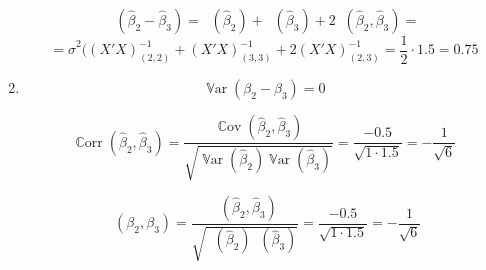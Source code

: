 \documentclass[12pt]{article}
\DeclareMathOperator{\Cov}{\mathbb{C}ov}
\DeclareMathOperator{\Corr}{\mathbb{C}orr}
\DeclareMathOperator{\Var}{\mathbb{V}ar}
\DeclareMathOperator{\hVar}{\widehat{\Var}}
\DeclareMathOperator{\hCov}{\widehat{\Cov}}
\DeclareMathOperator{\hCorr}{\widehat{\Corr}}
\newcommand{\hb}{\hat{\beta}}
\begin{document}
\begin{problem}
\begin{sol}
\begin{enumerate}
\[
\hVar(\hb_2-\hb_3)=\hVar(\hb_2)+\hVar(\hb_3)+2\hCov(\hb_2,\hb_3)=
\]
\[=\hat\sigma^2((X'X)^{-1}_{(2,2)}+(X'X)^{-1}_{(3,3)}+2(X'X)^{-1}_{(2,3)}=\frac{1}{2}\cdot1.5=0.75
\]

\item
\[
\Var(\beta_2-\beta_3)=0
\]

\[
\Corr(\hb_2,\hb_3)=\frac{\Cov(\hb_2,\hb_3)}{\sqrt{\Var(\hb_2)\Var(\hb_3)}}=\frac{-0.5}{\sqrt{1\cdot1.5}} = -\frac{1}{\sqrt{6}}
\]

\[
\hCorr(\beta_2,\beta_3)=\frac{\hCov(\hb_2,\hb_3)}{\sqrt{\hVar(\hb_2)\hVar(\hb_3)}}=\frac{-0.5}{\sqrt{1\cdot1.5}}=-\frac{1}{\sqrt6}
\]

\end{enumerate}

\end{sol}
\end{problem}
\end{document}
